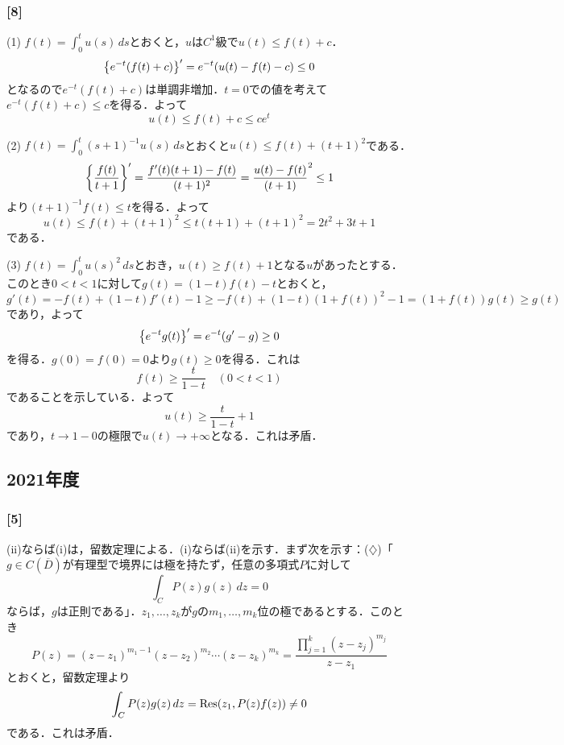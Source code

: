 \documentclass[a4j]{ltjsarticle}
\newcommand{\1}{\mathbbm{1}}
\numberwithin{equation}{section}
\theoremstyle{definition}
\begin{document}
\subsubsection*{[8]}
(1) $f(t)=\int_{0}^{t}u(s)\,ds$とおくと，$u$は$C^1$級で$u(t)\leq f(t)+c$．
\begin{equation}
    \qty{e^{-t}(f(t)+c)}'=e^{-t}\qty(u(t)-f(t)-c)\leq 0
\end{equation}
となるので$e^{-t}(f(t)+c)$は単調非増加．$t=0$での値を考えて$e^{-t}(f(t)+c)\leq c$を得る．よって
\begin{equation}
    u(t)\leq f(t)+c\leq ce^t 
\end{equation}

(2) $f(t)=\int_{0}^t(s+1)^{-1}u(s)\,ds$とおくと$u(t)\leq f(t)+(t+1)^2$である．
\begin{equation}
    \qty{\frac{f(t)}{t+1}}'=\frac{f'(t)(t+1)-f(t)}{(t+1)^2}=\frac{u(t)-f(t)}{(t+1)}^2\leq 1 
\end{equation}
より$(t+1)^{-1}f(t)\leq t$を得る．よって
\begin{equation}
    u(t)\leq f(t)+(t+1)^2\leq t(t+1)+(t+1)^2=2t^2+3t+1
\end{equation}
である．

(3) $f(t)=\int_{0}^tu(s)^2\,ds$とおき，$u(t)\geq f(t)+1$となる$u$があったとする．このとき$0<t<1$に対して$g(t)=(1-t)f(t)-t$とおくと，
\begin{equation}
    g'(t)=-f(t)+(1-t)f'(t)-1\geq -f(t)+(1-t)(1+f(t))^2-1=(1+f(t))g(t)\geq g(t)
\end{equation}
であり，よって
\begin{equation}
    \qty{e^{-t}g(t)}'=e^{-t}(g'-g)\geq0 
\end{equation}
を得る．$g(0)=f(0)=0$より$g(t)\geq 0$を得る．これは
\begin{equation}
    f(t)\geq \frac{t}{1-t}\quad (0<t<1)
\end{equation}
であることを示している．よって
\begin{equation}
    u(t)\geq \frac{t}{1-t}+1
\end{equation}
であり，$t\to1-0$の極限で$u(t)\to+\infty$となる．これは矛盾．
\subsection{2021年度}
\subsubsection*{[5]}
(ii)ならば(i)は，留数定理による．(i)ならば(ii)を示す．まず次を示す：($\diamondsuit$)「$g\in C(\overline{D})$が有理型で境界には極を持たず，任意の多項式$P$に対して
\begin{equation}
    \int_{C}P(z)g(z)\,dz=0 
\end{equation}
ならば，$g$は正則である」．$z_1,\ldots,z_k$が$g$の$m_1,\ldots,m_k$位の極であるとする．このとき
\begin{equation}
    P(z)=(z-z_1)^{m_1-1}(z-z_2)^{m_2}\cdots (z-z_k)^{m_k}=\frac{\prod_{j=1}^k(z-z_j)^{m_j}}{z-z_1}
\end{equation}
とおくと，留数定理より
\begin{equation}
    \int_{C}P(z)g(z)\,dz=\Residue(z_1,P(z)f(z))\neq0 
\end{equation}
である．これは矛盾．
\end{document}
